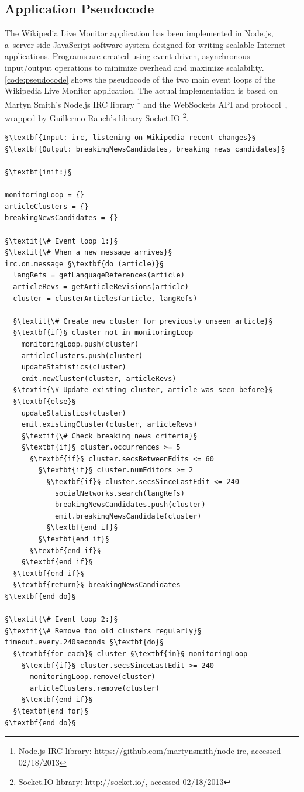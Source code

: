 \documentclass{sig-alternate}
\newcommand{\inlinelistingsize}{\fontsize{8pt}{11pt}}
\let\oldurl\url
\renewcommand{\url}[1]{\inlinelistingsize\oldurl{#1}}
\begin{document}
\subsection{Application Pseudocode}

The Wikipedia Live Monitor application has been implemented in Node.js,
a~server side JavaScript software system
designed for writing scalable Internet applications.
Programs are created using event-driven, asynchronous input/output operations
to minimize overhead and maximize scalability.
\autoref{code:pseudocode} shows the pseudocode of the two main event loops of the
Wikipedia Live Monitor application.
The actual implementation is based on 
Martyn Smith's Node.js IRC library%
\footnote{Node.js IRC library: \url{https://github.com/martynsmith/node-irc},
accessed 02/18/2013} and
the WebSockets API and protocol~\cite{hickson2012websockets},
wrapped by  Guillermo Rauch's library Socket.IO%
\footnote{Socket.IO library: \url{http://socket.io/},
accessed 02/18/2013}.

\begin{lstlisting}[caption=Pseudocode of the two main event loops of the Wikipedia Live Monitor application,
  label=code:pseudocode, float]
§\textbf{Input: irc, listening on Wikipedia recent changes}§ 
§\textbf{Output: breakingNewsCandidates, breaking news candidates}§ 

§\textbf{init:}§

monitoringLoop = {}
articleClusters = {}
breakingNewsCandidates = {}
  
§\textit{\# Event loop 1:}§
§\textit{\# When a new message arrives}§
irc.on.message §\textbf{do (article)}§
  langRefs = getLanguageReferences(article)
  articleRevs = getArticleRevisions(article)
  cluster = clusterArticles(article, langRefs)  
  
  §\textit{\# Create new cluster for previously unseen article}§
  §\textbf{if}§ cluster not in monitoringLoop
    monitoringLoop.push(cluster)
    articleClusters.push(cluster)
    updateStatistics(cluster)
    emit.newCluster(cluster, articleRevs)    
  §\textit{\# Update existing cluster, article was seen before}§
  §\textbf{else}§
    updateStatistics(cluster)
    emit.existingCluster(cluster, articleRevs)
    §\textit{\# Check breaking news criteria}§
    §\textbf{if}§ cluster.occurrences >= 5
      §\textbf{if}§ cluster.secsBetweenEdits <= 60      
        §\textbf{if}§ cluster.numEditors >= 2
          §\textbf{if}§ cluster.secsSinceLastEdit <= 240
            socialNetworks.search(langRefs)
            breakingNewsCandidates.push(cluster)
            emit.breakingNewsCandidate(cluster)            
          §\textbf{end if}§          
        §\textbf{end if}§  
      §\textbf{end if}§        
    §\textbf{end if}§          
  §\textbf{end if}§
  §\textbf{return}§ breakingNewsCandidates
§\textbf{end do}§

§\textit{\# Event loop 2:}§
§\textit{\# Remove too old clusters regularly}§
timeout.every.240seconds §\textbf{do}§
  §\textbf{for each}§ cluster §\textbf{in}§ monitoringLoop
    §\textbf{if}§ cluster.secsSinceLastEdit >= 240
      monitoringLoop.remove(cluster)
      articleClusters.remove(cluster)
    §\textbf{end if}§
  §\textbf{end for}§ 
§\textbf{end do}§
\end{lstlisting}
\end{document}
